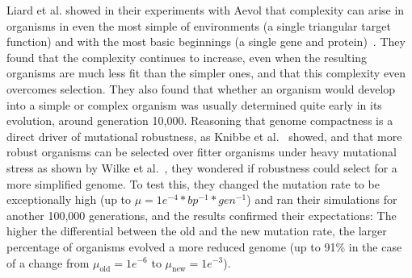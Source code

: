 Liard et al. showed in their experiments with Aevol that complexity can arise in organisms in even the most simple of environments (a single triangular target function) and with the most basic beginnings (a single gene and protein)~\cite{Liard.2018}. They found that the complexity continues to increase, even when the resulting organisms are much less fit than the simpler ones, and that this complexity even overcomes selection. They also found that whether an organism would develop into a simple or complex organism was usually determined quite early in its evolution, around generation 10,000. Reasoning that genome compactness is a direct driver of mutational robustness, as Knibbe et al.~\cite{Knibbe2007} showed, and that more robust organisms can be selected over fitter organisms under heavy mutational stress as shown by Wilke et al.~\cite{wilke2001evolution}, they wondered if robustness could select for a more simplified genome. To test this, they changed the mutation rate to be exceptionally high (up to $\mu = 1e^{-4} *bp^{-1}*gen^{-1}$) and ran their simulations for another 100,000 generations, and the results confirmed their expectations: The higher the differential between the old and the new mutation rate, the larger percentage of organisms evolved a more reduced genome (up to 91\% in the case of a change from $\mu_\text{old}=1e^{-6}$ to $\mu_\text{new}=1e^{-3}$).




